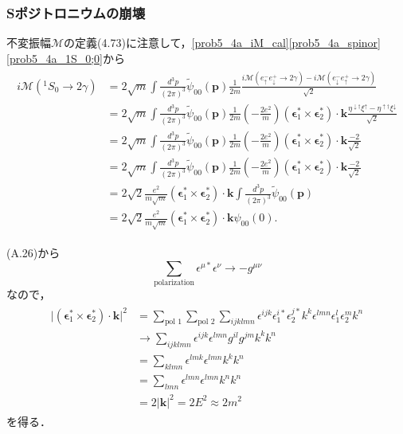 \subsubsection{Sポジトロニウムの崩壊}
不変振幅$\mathcal{M}$の定義(4.73)に注意して，\eqref{prob5_4a_iM_cal}\eqref{prob5_4a_spinor}\eqref{prob5_4a_1S_0;0}から
\begin{align}
  \begin{split}
    i\mathcal{M}(^1S_0 \to 2\gamma) &= 2\sqrt{m} \int \frac{d^3p}{(2\pi)^3} \tilde{\psi}_{00}(\boldsymbol{p}) \frac{1}{2m}
    \frac{i\mathcal{M}(e^-_\uparrow e^+_\downarrow \to 2\gamma) - i\mathcal{M}(e^-_\downarrow e^+_\uparrow \to 2\gamma)}{\sqrt{2}} \\
    &= 2\sqrt{m} \int \frac{d^3p}{(2\pi)^3} \tilde{\psi}_{00}(\boldsymbol{p}) \frac{1}{2m} \left( -\frac{2e^2}{m} \right) (\boldsymbol{\epsilon}_1^\ast \times \boldsymbol{\epsilon}_2^\ast) \cdot \boldsymbol{k}
    \frac{ \eta^{\downarrow\dagger}\xi^\uparrow - \eta^{\uparrow\dagger}\xi^\downarrow}{\sqrt{2}} \\
    &= 2\sqrt{m} \int \frac{d^3p}{(2\pi)^3} \tilde{\psi}_{00}(\boldsymbol{p}) \frac{1}{2m} \left( -\frac{2e^2}{m} \right) (\boldsymbol{\epsilon}_1^\ast \times \boldsymbol{\epsilon}_2^\ast) \cdot \boldsymbol{k} \frac{-2}{\sqrt{2}} \\
    &= 2\sqrt{m} \int \frac{d^3p}{(2\pi)^3} \tilde{\psi}_{00}(\boldsymbol{p}) \frac{1}{2m} \left( -\frac{2e^2}{m} \right) (\boldsymbol{\epsilon}_1^\ast \times \boldsymbol{\epsilon}_2^\ast) \cdot \boldsymbol{k} \frac{-2}{\sqrt{2}} \\
    &= 2\sqrt{2} \frac{e^2}{m\sqrt{m}}  (\boldsymbol{\epsilon}_1^\ast \times \boldsymbol{\epsilon}_2^\ast) \cdot \boldsymbol{k} \int \frac{d^3p}{(2\pi)^3} \tilde{\psi}_{00}(\boldsymbol{p}) \\
    &= 2\sqrt{2} \frac{e^2}{m\sqrt{m}} (\boldsymbol{\epsilon}_1^\ast \times \boldsymbol{\epsilon}_2^\ast) \cdot \boldsymbol{k} \psi_{00}(0) .
  \end{split}
  \label{prob5_4a_1S_0_2hv}
\end{align}

(A.26)から
\[ \sum_\text{polarization} \epsilon^{\mu\ast}\epsilon^\nu \to -g^{\mu\nu} \]
なので，
\begin{align}
  \begin{split}
    \lvert (\boldsymbol{\epsilon}_1^\ast \times \boldsymbol{\epsilon}_2^\ast) \cdot \boldsymbol{k} \rvert^2
    &= \sum_\text{pol 1}\sum_\text{pol 2}\sum_{ijklmn} \epsilon^{ijk} \epsilon_1^{i\ast}\epsilon_2^{j\ast} k^k \epsilon^{lmn} \epsilon_1^l\epsilon_2^m k^n \\
    &\to \sum_{ijklmn} \epsilon^{ijk}\epsilon^{lmn} g^{il} g^{jm} k^k k^n \\
    &= \sum_{klmn} \epsilon^{lmk}\epsilon^{lmn} k^k k^n \\
    &= \sum_{lmn} \epsilon^{lmn}\epsilon^{lmn} k^n k^n \\
    &= 2\lvert\boldsymbol{k}\rvert^2 = 2E^2 \approx 2m^2
  \end{split}
  \label{prob5_4a_pol_sum}
\end{align}
を得る．

